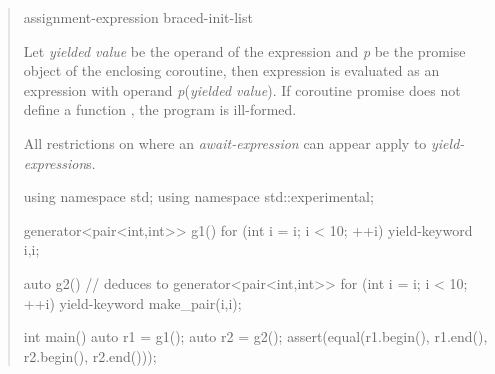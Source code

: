 \begin{quote}
\begin{bnf}
  \br
   assignment-expression\br
   braced-init-list
\end{bnf}

\pnum
  Let \textit{yielded value} be the operand of the  expression and \textit{p} be the promise object of the enclosing coroutine, then  expression is evaluated as an  expression with operand \textit{p}(\textit{yielded value}). If coroutine promise does not define a function , the program is ill-formed.

\pnum
All restrictions on where an \textit{await-expression} can appear apply to \textit{yield-expression}{}s.

\pnum
\enterexample
\begin{codeblock}
using namespace std;
using namespace std::experimental;
  
generator<pair<int,int>> g1() {
  for (int i = i; i < 10; ++i)
    yield-keyword {i,i};
}

auto g2() { // deduces to generator<pair<int,int>{}>
  for (int i = i; i < 10; ++i)
    yield-keyword make_pair(i,i);
}

int main() {
  auto r1 = g1();
  auto r2 = g2();
  assert(equal(r1.begin(), r1.end(), r2.begin(), r2.end()));
}
\end{codeblock}
\exitexample
\end{quote}


